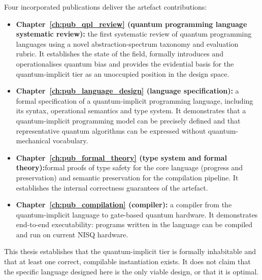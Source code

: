 Four incorporated publications deliver the artefact contributions:
\begin{itemize}
    \item \textbf{Chapter~\ref{ch:pub_qpl_review} (quantum programming language systematic review):} the first systematic review of quantum programming languages using a novel abstraction-spectrum taxonomy and evaluation rubric.
    It establishes the state of the field, formally introduces and operationalises quantum bias and provides the evidential basis for the quantum-implicit tier as an unoccupied position in the design space.

    \item \textbf{Chapter~\ref{ch:pub_language_design} (language specification):} a formal specification of a quantum-implicit programming language, including its syntax, operational semantics and type system.
    It demonstrates that a quantum-implicit programming model can be precisely defined and that representative quantum algorithms can be expressed without quantum-mechanical vocabulary.

    \item \textbf{Chapter~\ref{ch:pub_formal_theory} (type system and formal theory):}formal proofs of type safety for the core language (progress and preservation) and semantic preservation for the compilation pipeline.
    It establishes the internal correctness guarantees of the artefact.

    \item \textbf{Chapter~\ref{ch:pub_compilation} (compiler):} a compiler from the quantum-implicit language to gate-based quantum hardware.
    It demonstrates end-to-end executability: programs written in the language can be compiled and run on current NISQ hardware.
\end{itemize}

This thesis establishes that the quantum-implicit tier is formally inhabitable and that at least one correct, compilable instantiation exists.
It does not claim that the specific language designed here is the only viable design, or that it is optimal.